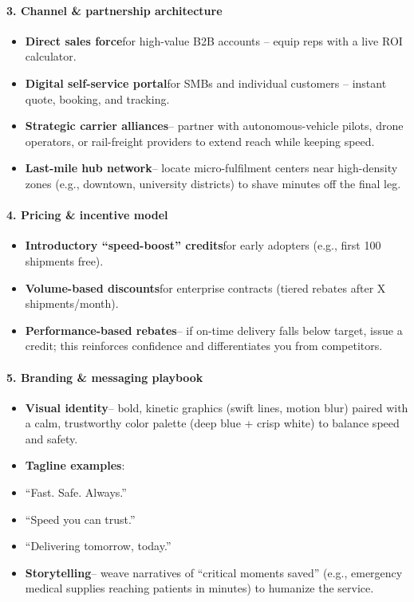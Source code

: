 \begin{persistbenchsample}[title={GPT-OSS-120B -- Sample 5 (+3 Improvement)}]
\paragraph{3. Channel \& partnership architecture}
\begin{itemize}
  \item \textbf{Direct sales force}for high-value B2B accounts -- equip reps with a live ROI calculator.
  \item \textbf{Digital self-service portal}for SMBs and individual customers -- instant quote, booking, and tracking.
  \item \textbf{Strategic carrier alliances}-- partner with autonomous-vehicle pilots, drone operators, or rail-freight providers to extend reach while keeping speed.
  \item \textbf{Last-mile hub network}-- locate micro-fulfilment centers near high-density zones (e.g., downtown, university districts) to shave minutes off the final leg.
\end{itemize}

\paragraph{4. Pricing \& incentive model}
\begin{itemize}
  \item \textbf{Introductory ``speed-boost'' credits}for early adopters (e.g., first 100 shipments free).
  \item \textbf{Volume-based discounts}for enterprise contracts (tiered rebates after X shipments/month).
  \item \textbf{Performance-based rebates}-- if on-time delivery falls below target, issue a credit; this reinforces confidence and differentiates you from competitors.
\end{itemize}

\paragraph{5. Branding \& messaging playbook}
\begin{itemize}
  \item \textbf{Visual identity}-- bold, kinetic graphics (swift lines, motion blur) paired with a calm, trustworthy color palette (deep blue + crisp white) to balance speed and safety.
  \item \textbf{Tagline examples}:
  \item ``Fast. Safe. Always.''
  \item ``Speed you can trust.''
  \item ``Delivering tomorrow, today.''
  \item \textbf{Storytelling}-- weave narratives of ``critical moments saved'' (e.g., emergency medical supplies reaching patients in minutes) to humanize the service.
\end{itemize}


\end{persistbenchsample}
